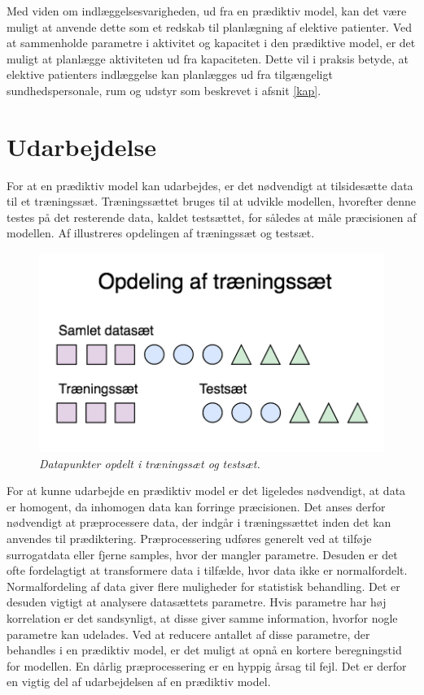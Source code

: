 Med viden om indlæggelsesvarigheden, ud fra en prædiktiv model, kan det være muligt at anvende dette som et redskab til planlægning af elektive patienter. Ved at sammenholde parametre i aktivitet og kapacitet i den prædiktive model, er det muligt at planlægge aktiviteten ud fra kapaciteten. Dette vil i praksis betyde, at elektive patienters indlæggelse kan planlægges ud fra tilgængeligt sundhedspersonale, rum og udstyr som beskrevet i afsnit \ref{kap}. 


\section{Udarbejdelse}

For at en prædiktiv model kan udarbejdes, er det nødvendigt at tilsidesætte data til et træningssæt. Træningssættet bruges til at udvikle modellen, hvorefter denne testes på det resterende data, kaldet testsættet, for således at måle præcisionen af modellen. Af  illustreres opdelingen af træningssæt og testsæt.

\begin{figure}[H]
	\centering
	\includegraphics[scale=.7]{figures/xval.png}
	\caption{\textit{Datapunkter opdelt i træningssæt og testsæt.}\cite{Kuhn2013}}
	\label{traenings}
\end{figure}

\noindent
For at kunne udarbejde en prædiktiv model er det ligeledes nødvendigt, at data er homogent, da inhomogen data kan forringe præcisionen. 
Det anses derfor nødvendigt at præprocessere data, der indgår i træningssættet inden det kan anvendes til prædiktering.\cite{Kuhn2013}
Præprocessering udføres generelt ved at tilføje surrogatdata eller fjerne samples, hvor der mangler parametre. Desuden er det ofte fordelagtigt at transformere data i tilfælde, hvor data ikke er normalfordelt. Normalfordeling af data giver flere muligheder for statistisk behandling.
Det er desuden vigtigt at analysere datasættets parametre. Hvis parametre har høj korrelation er det sandsynligt, at disse giver samme information, hvorfor nogle parametre kan udelades. Ved at reducere antallet af disse parametre, der behandles i en prædiktiv model, er det muligt at opnå en kortere beregningstid for modellen.
En dårlig præprocessering er en hyppig årsag til fejl. Det er derfor en vigtig del af udarbejdelsen af en prædiktiv model.\cite{Kuhn2013}


